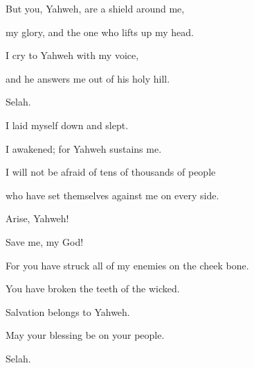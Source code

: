 {\Q {}But you, Yahweh, are a shield around me,
\par }{\QB my glory, and the one who lifts up my head.
\par }{\Q {}I cry to Yahweh with my voice,
\par }{\QB and he answers me out of his holy hill.
\par }{\QS Selah.\par }
{\Q {}I laid myself down and slept.
\par }{\QB I awakened; for Yahweh sustains me.
\par }{\Q {}I will not be afraid of tens of thousands of people
\par }{\QB who have set themselves against me on every side.
\par }{\Q {}Arise, Yahweh!
\par }{\QB Save me, my God!
\par }{\Q For you have struck all of my enemies on the cheek bone.
\par }{\QB You have broken the teeth of the wicked.
\par }{\Q {}Salvation belongs to Yahweh.
\par }{\QB May your blessing be on your people.
\par }{\QS Selah.\par }


